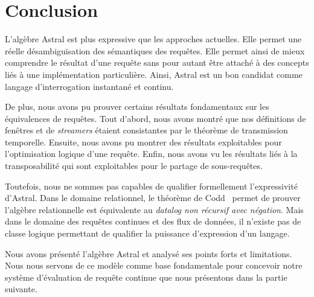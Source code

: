 \section{Conclusion}\label{sec:valid:expressivite:conclusion}
L'algèbre Astral est plus expressive que les approches actuelles. Elle permet une réelle désambiguïsation des sémantiques des requêtes. Elle permet ainsi de mieux comprendre le résultat d'une requête sans pour autant être attaché à des concepts liés à une implémentation particulière. Ainsi, Astral est un bon candidat comme langage d'interrogation instantané et continu.

De plus, nous avons pu prouver certains résultats fondamentaux sur les équivalences de requêtes. Tout d'abord, nous avons montré que nos définitions de fenêtres et de \textit{streamers} étaient consistantes par le théorème de transmission temporelle. Ensuite, nous avons pu montrer des résultats exploitables pour l'optimisation logique d'une requête. Enfin, nous avons vu les résultats liés à la transposabilité qui sont exploitables pour le partage de sous-requêtes.

Toutefois, nous ne sommes pas capables de qualifier formellement l'expressivité d'Astral. Dans le domaine relationnel, le théorème de Codd~\cite{Codd:theorem} permet de prouver l'algèbre relationnelle est équivalente au \textit{datalog non récursif avec négation}. Mais dans le domaine des requêtes continues et des flux de données, il n'existe pas de classe logique permettant de qualifier la puissance d'expression d'un langage.

Nous avons présenté l'algèbre Astral et analysé ses points forts et limitations. Nous nous servons de ce modèle comme base fondamentale pour concevoir notre système d'évaluation de requête continue que nous présentons dans la partie suivante.